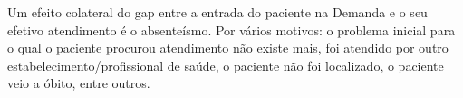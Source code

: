 Um efeito colateral do gap entre a entrada do paciente na Demanda e o seu efetivo atendimento é o absenteísmo. Por vários motivos: o problema inicial para o qual o paciente procurou atendimento não existe mais, foi atendido por outro estabelecimento/profissional de saúde, o paciente não foi localizado, o paciente veio a óbito, entre outros. 

